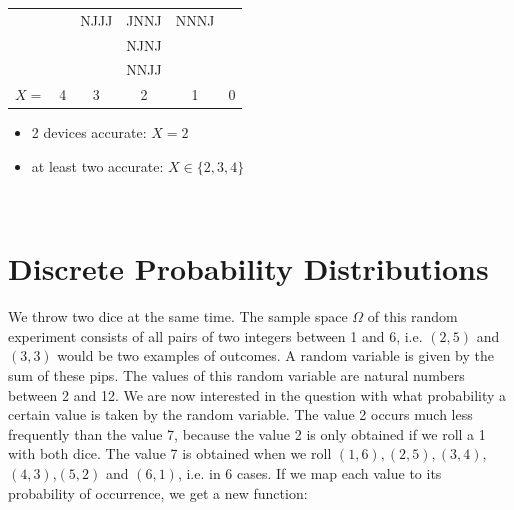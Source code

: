 \documentclass[twoside,11pt,a4paper]{article}
\newif\ifEN \ENtrue	                %
\def\tr|#1|#2|{\ifEN #2\else #1\fi}     %
\def\vsp{\vspace{5mm}}
\theoremstyle{definition}
\def\answerline#1{%
   \ifhmode\\[1ex]\fcolorbox{solbox}{solbox}{\hbox to \linewidth{\vbox to #1\baselineskip{}}}%
   \else\fcolorbox{solbox}{solbox}{\hbox to \linewidth{\vbox to #1\baselineskip{}}}%
   \fi
 }
\begin{document}
\begin{xxwrap}
\begin{Answer}
\begin{enumerate}
{\begin{tabular}[t]{cccccc}
        &    &NJJJ&JNNJ&NNNJ&    \\
        &    &    &NJNJ&    &    \\
        &    &    &NNJJ&    &    \\
        $X =$ & 4  &  3 & 2  &  1 &0    
      \end{tabular}
      \fi
    }
    \begin{itemize}
    \item \tr|2 Wagen funktionieren|2 devices accurate|: $X=2$
    \item \tr|Mindestens 2 funktionieren|at least two accurate|: $X\in \{2,3,4\}$ 
    \end{itemize}
  \end{enumerate}
\end{Answer}
\answerline{12}
\end{xxwrap}
\vfill

\newpage

\section{\tr|Diskrete Wahrscheinlichkeitsverteilungen|Discrete Probability Distributions|}
\tr|Wir werfen zwei Würfel gleichzeitig. Der Ereignisraum $\Omega$ dieses Zufallsexperiments besteht aus allen Paaren von ganzen Zahlen zwischen 1 und 6, z.B. wären $(3,3)$ und $(2,5)$ solche Ergebnisse. 
    Eine mögliche Zufallsvariable wäre die Summe der Augenzahlen. Die möglichen Werte diese Zufalsvariable sind die natürlichen Zahlen zwischen 2 und 12. 
   |We throw two dice at the same time. The sample space $\Omega$ of this random experiment consists of all pairs of two integers between 1 and 6, i.e. $(2,5)$ and $(3,3)$ would be two examples of outcomes.
    A random variable is given by the sum of these pips. The values of this random variable are natural numbers between 2 and 12. |
\tr |Wir wollen untersuchen, mit welcher Wahrscheinlichkeit diese Zufallsvariable einen gewissen Wert annimmt. 
     Z.B. taucht der Wert 2 viel seltener auf als der Wert 7, da der Wert 2 nur dann erreicht wird, wenn wir mit beiden Würfeln eine 1 würfeln, den Wert 7 erreichen wir hingegen
     in den folgenden Fällen   $(1,6),(2,5),(3,4)$,$(4,3)$,$(5,2)$ und $(6,1)$, d.h. in 6 Fällen. 
    |We are now interested in the question with what probability a certain value is taken by the random variable.  
     The value 2 occurs much less frequently than the value 7, because the value 2 is only obtained if we roll a 1 with both dice.  
     The value 7 is obtained when we roll $(1,6),(2,5),(3,4)$,$(4,3)$,$(5,2)$ and $(6,1)$, i.e. in 6 cases. 
     If we map each value to its probability of occurrence, we get a new function:|
\vsp\vsp
\end{document}
